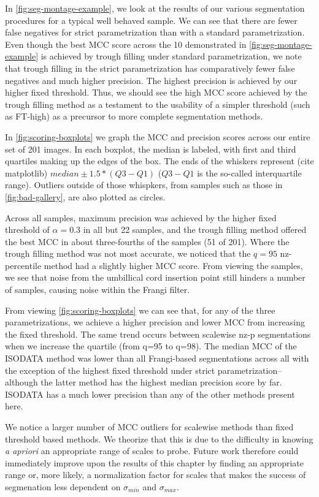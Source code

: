 In \cref{fig:seg-montage-example}, we look at the results of our various segmentation procedures for a typical well behaved sample. We can see that there are fewer false negatives for strict parametrization than with a standard parametrization. Even though the best MCC score across the 10 demonstrated in \cref{fig:seg-montage-example} is achieved by trough filling under standard parametrization, we note that trough filling in the strict parametrization has comparatively fewer false negatives and much higher precision. The highest precision is achieved by our higher fixed threshold. Thus, we should see the high MCC score achieved by the trough filling method as a testament to the usability of a simpler threshold (such as FT-high) as a precursor to more complete segmentation methods.


In \cref{fig:scoring-boxplots} we graph the MCC and precision scores across our entire set of 201 images. In each boxplot, the median is labeled, with first and third quartiles making up the edges of the box. The ends of the whiskers represent (cite matplotlib) $median \pm 1.5*(Q3-Q1)$ ($Q3-Q1$ is the so-called interquartile range). Outliers outside of those whispkers, from samples such as those in \cref{fig:bad-gallery}, are also plotted as circles.

Across all samples, maximum precision was achieved by the higher fixed threshold of $\alpha =0.3 $ in all but 22 samples, and the trough filling method offered the best MCC in about three-fourths of the samples (51 of 201). Where the trough filling method was not most accurate, we noticed that the $q=95 $ nz-percentile method had a slightly higher MCC score. From viewing the samples, we see that noise from the umbillical cord insertion point still hinders a number of samples, causing noise within the Frangi filter. 

From viewing \cref{fig:scoring-boxplots} we can see that, for any of the
three parametrizations, we achieve a higher precision and lower MCC from increasing the fixed threshold. The same trend occurs between scalewise nz-p segmentations when we increase the quartile (from q=95 to q=98). The median MCC of the ISODATA method was lower than all Frangi-based segmentations across all with the exception of the highest fixed threshold under strict parametrization--although the latter method has the highest median precision score by far. ISODATA has a much lower precision than any of the other methods present here.

We notice a larger number of MCC outliers for scalewise methods than fixed threshold based methods. We theorize that this is due to the difficulty in knowing \textit{a apriori} an appropriate range of scales to probe. Future work therefore could immediately improve upon the results of this chapter by finding an appropriate range or, more likely, a normalization factor for scales that makes the success of segmenation less dependent on $\sigma_{min}$ and $\sigma_{max}$.

